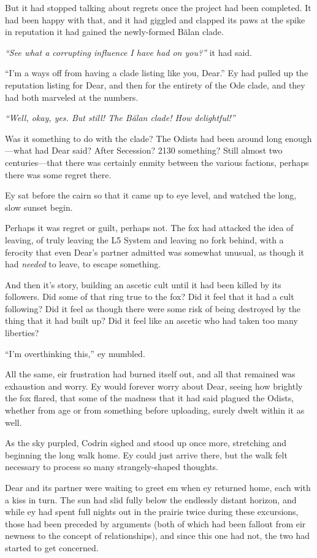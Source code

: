 But it had stopped talking about regrets once the project had been completed. It had been happy with that, and it had giggled and clapped its paws at the spike in reputation it had gained the newly-formed Bălan clade.

\emph{``See what a corrupting influence I have had on you?''} it had said.

``I'm a ways off from having a clade listing like you, Dear.'' Ey had pulled up the reputation listing for Dear, and then for the entirety of the Ode clade, and they had both marveled at the numbers.

\emph{``Well, okay, yes. But still! The Bălan clade! How delightful!''}

Was it something to do with the clade? The Odists had been around long enough---what had Dear said? After Secession? 2130 something? Still almost two centuries---that there was certainly enmity between the various factions, perhaps there was some regret there.

Ey sat before the cairn so that it came up to eye level, and watched the long, slow sunset begin.

Perhaps it was regret or guilt, perhaps not. The fox had attacked the idea of leaving, of truly leaving the L5 System and leaving no fork behind, with a ferocity that even Dear's partner admitted was somewhat unusual, as though it had \emph{needed} to leave, to escape something.

And then it's story, building an ascetic cult until it had been killed by its followers. Did some of that ring true to the fox? Did it feel that it had a cult following? Did it feel as though there were some risk of being destroyed by the thing that it had built up? Did it feel like an ascetic who had taken too many liberties?

``I'm overthinking this,'' ey mumbled.

All the same, eir frustration had burned itself out, and all that remained was exhaustion and worry. Ey would forever worry about Dear, seeing how brightly the fox flared, that some of the madness that it had said plagued the Odists, whether from age or from something before uploading, surely dwelt within it as well.

As the sky purpled, Codrin sighed and stood up once more, stretching and beginning the long walk home. Ey could just arrive there, but the walk felt necessary to process so many strangely-shaped thoughts.

Dear and its partner were waiting to greet em when ey returned home, each with a kiss in turn. The sun had slid fully below the endlessly distant horizon, and while ey had spent full nights out in the prairie twice during these excursions, those had been preceded by arguments (both of which had been fallout from eir newness to the concept of relationships), and since this one had not, the two had started to get concerned.

